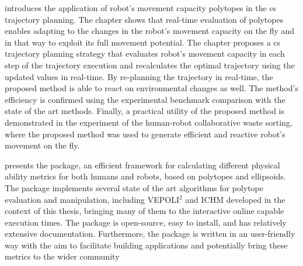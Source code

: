  introduces the application of robot's movement capacity polytopes in the \gls{cs} trajectory planning.
The chapter shows that real-time evaluation of polytopes enables adapting to the changes in the robot's movement capacity on the fly and in that way to exploit its full movement potential.
The chapter proposes a \gls{cs} trajectory planning strategy that evaluates robot's movement capacity in each step of the trajectory execution and recalculates the optimal trajectory using the updated values in real-time.
By re-planning the trajectory in real-time, the proposed method is able to react on environmental changes as well.
The method's efficiency is confirmed using the experimental benchmark comparison with the state of the art methods. 
Finally, a practical utility of the proposed method is demonstrated in the experiment of the human-robot collaborative waste sorting, where the proposed method was used to generate efficient and reactive robot's movement on the fly.


 presents the  package, an efficient framework for calculating different physical ability metrics for both humans and robots, based on polytopes and ellipsoids.
The package implements several state of the art algorithms for polytope evaluation and manipulation, including VEPOLI$^2$ and ICHM developed in the context of this thesis, bringing many of them to the interactive online capable execution times.
The package is open-source, easy to install, and has relatively extensive documentation. Furthermore, the package is written in an user-friendly way with the aim to facilitate building applications and potentially bring these metrics to the wider community


